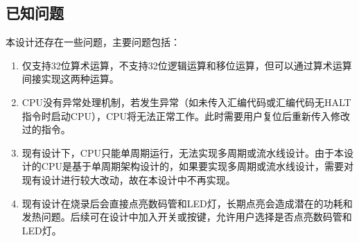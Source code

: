 \documentclass[lang=cn,a4paper,newtx]{elegantpaper}
\begin{document}
\subsection{已知问题}
本设计还存在一些问题，主要问题包括：
\begin{enumerate}
  \item 仅支持32位算术运算，不支持32位逻辑运算和移位运算，但可以通过算术运算间接实现这两种运算。
  
  \item CPU没有异常处理机制，若发生异常（如未传入汇编代码或汇编代码无HALT指令时启动CPU），CPU将无法正常工作。此时需要用户复位后重新传入修改过的指令。
  
  \item 现有设计下，CPU只能单周期运行，无法实现多周期或流水线设计。由于本设计的CPU是基于单周期架构设计的，如果要实现多周期或流水线设计，需要对现有设计进行较大改动，故在本设计中不再实现。
  
  \item 现有设计在烧录后会直接点亮数码管和LED灯，长期点亮会造成潜在的功耗和发热问题。后续可在设计中加入开关或按键，允许用户选择是否点亮数码管和LED灯。
\end{enumerate}
\newpage
\printbibliography
\newpage
\addappheadtotoc
\end{document}
